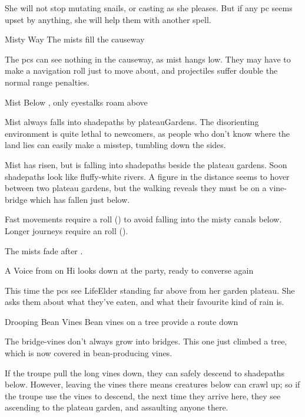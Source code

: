 She will not stop mutating snails, or \gls{casting} as she pleases.
But if any \gls{pc} seems upset by anything, she will help them with another spell.

\LifeElder

\showStdSpells

{Misty Way}%
{The mists fill the causeway}%

The \glspl{pc} can see nothing in the causeway, as mist hangs low.
They may have to make a navigation roll just to move about, and projectiles suffer double the normal range penalties.

{Mist Below}%
{, only eyestalks roam above}%

Mist always falls into \gls{shadepaths} by \gls{plateauGardens}.
The disorienting environment is quite lethal to newcomers, as people who don't know where the land lies can easily make a misstep, tumbling down the sides.

\begin{boxtext}
  Mist has risen, but is falling into \gls{shadepaths} beside the plateau gardens.
  Soon \gls{shadepaths} look like fluffy-white rivers.
  A figure in the distance seems to hover between two plateau gardens, but the walking reveals they must be on a vine-bridge which has fallen just below.
\end{boxtext}

Fast movements require a  roll (\tn[8]) to avoid falling into the misty canals below.
Longer journeys require an  roll (\tn[10]).

The mists fade after .

{A Voice from on Hi}%
{ looks down at the party, ready to converse again}%

This time the \glspl{pc} see \gls{LifeElder} standing far above from her garden plateau.
She asks them about what they've eaten, and what their favourite kind of rain is.

{Drooping Bean Vines}%
{Bean vines on a tree provide a route down}%

The bridge-vines don't always grow into bridges.
This one just climbed a tree, which is now covered in bean-producing vines.

If the troupe pull the long vines down, they can safely descend to \gls{shadepaths} below.
However, leaving the vines there means creatures below can crawl up; so if the troupe use the vines to descend, the next time they arrive here, they see  ascending to the plateau garden, and assaulting anyone there.

